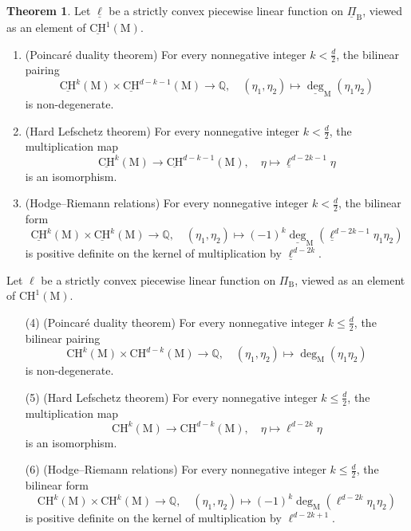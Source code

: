 \documentclass[11pt,reqno]{amsart}
\theoremstyle{definition}
\newtheorem{theorem}{Theorem}[section]
\theoremstyle{remark}
\renewcommand{\(}{\left(}
\renewcommand{\)}{\right)}
\newcommand{\<}{\left<}
\renewcommand{\>}{\right>}
\begin{document}
\begin{theorem}\label{TheoremChowKahlerPackage}
Let $\underline{\ell}$ be a strictly convex piecewise linear function on $\underline{\Pi}_\mathrm{B}$, viewed as an element of $\underline{\mathrm{CH}}^1(\mathrm{M})$.
\begin{enumerate}[(1)]\itemsep 5pt
\item (Poincar\'e duality theorem) For every nonnegative integer $k < \frac{d}{2}$, the bilinear pairing
\[
\underline{\mathrm{CH}}^k(\mathrm{M})  \times \underline{\mathrm{CH}}^{d-k-1}(\mathrm{M})  \longrightarrow \mathbb{Q}, \quad (\eta_1,\eta_2) \longmapsto \underline{\deg}_\mathrm{M}(\eta_1 \eta_2)
\]
is non-degenerate.
\item (Hard Lefschetz theorem)  For every nonnegative integer $k < \frac{d}{2}$, the multiplication map
\[
\underline{\mathrm{CH}}^k(\mathrm{M})  \longrightarrow  \underline{\mathrm{CH}}^{d-k-1}(\mathrm{M}), \quad \eta \longmapsto \underline{\ell}^{d-2k-1}  \eta
\]
is an isomorphism.
\item (Hodge--Riemann relations) For every nonnegative integer $k <\frac{d}{2}$, the bilinear form
\[
\underline{\mathrm{CH}}^k(\mathrm{M})  \times \underline{\mathrm{CH}}^{k}(\mathrm{M})  \longrightarrow \mathbb{Q}, \quad (\eta_1,\eta_2) \longmapsto (-1)^k \underline{\deg}_\mathrm{M}(\underline{\ell}^{d-2k-1} \eta_1 \eta_2)
\]
is positive definite on the kernel of multiplication by $\underline{\ell}^{d-2k}$.
\end{enumerate}
Let $\ell$ be a strictly convex piecewise linear function on $\Pi_\mathrm{B}$,  viewed as an element of $\mathrm{CH}^1(\mathrm{M})$.
\begin{enumerate}[(1)]\itemsep 5pt
\item[(4)] (Poincar\'e duality theorem) For every nonnegative integer $k \le \frac{d}{2}$, the bilinear pairing
\[
\mathrm{CH}^k(\mathrm{M})  \times \mathrm{CH}^{d-k}(\mathrm{M})  \longrightarrow \mathbb{Q}, \quad (\eta_1,\eta_2) \longmapsto \deg_\mathrm{M}(\eta_1 \eta_2)
\]
is non-degenerate.
\item[(5)] (Hard Lefschetz theorem)  For every nonnegative integer $k \le \frac{d}{2}$, the multiplication map
\[
\mathrm{CH}^k(\mathrm{M})  \longrightarrow  \mathrm{CH}^{d-k}(\mathrm{M}), \quad \eta \longmapsto \ell^{d-2k} \eta
\]
is an isomorphism.
\item[(6)] (Hodge--Riemann relations) For every nonnegative integer $k \le \frac{d}{2}$, the bilinear form
\[
\mathrm{CH}^k(\mathrm{M})  \times \mathrm{CH}^{k}(\mathrm{M})  \longrightarrow \mathbb{Q}, \quad (\eta_1,\eta_2) \longmapsto (-1)^k \deg_\mathrm{M}( \ell^{d-2k} \eta_1 \eta_2)
\]
is positive definite on the kernel of multiplication by $\ell^{d-2k+1}$.
\end{enumerate}
\end{theorem}
\end{document}
